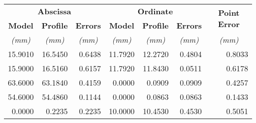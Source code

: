 \begin{table}[h!]
\centering
\begin{tabular}{|r|r|r|r|r|r|r|}
\hline
\multicolumn{3}{|c|}{\textbf{Abscissa}}                                                                             & \multicolumn{3}{c|}{\textbf{Ordinate}}                                                                             & \multicolumn{1}{c|}{\multirow{2}{*}{\textbf{Point Error}}} \\ \cline{1-6}
\multicolumn{1}{|c|}{\textbf{Model}} & \multicolumn{1}{c|}{\textbf{Profile}} & \multicolumn{1}{c|}{\textbf{Errors}} & \multicolumn{1}{c|}{\textbf{Model}} & \multicolumn{1}{c|}{\textbf{Profile}} & \multicolumn{1}{c|}{\textbf{Errors}} & \multicolumn{1}{c|}{}                                      \\ \hline
\multicolumn{1}{|c|}{\textit{(mm)}}           & \multicolumn{1}{c|}{\textit{(mm)}}      & \multicolumn{1}{c|}{\textit{(mm)}}      & \multicolumn{1}{c|}{\textit{(mm)}} & \multicolumn{1}{c|}{\textit{(mm)}}      & \multicolumn{1}{c|}{\textit{(mm)}}      & \multicolumn{1}{c|}{\textit{(mm)}}          \\ \hline
15.9010                              & 16.5450                               & 0.6438                               & 11.7920                             & 12.2720                               & 0.4804                               & 0.8033                                                     \\ \hline
15.9000                              & 16.5160                               & 0.6157                               & 11.7920                             & 11.8430                               & 0.0511                               & 0.6178                                                     \\ \hline
63.6000                              & 63.1840                               & 0.4159                               & 0.0000                              & 0.0909                                & 0.0909                               & 0.4257                                                     \\ \hline
54.6000                              & 54.4860                               & 0.1144                               & 0.0000                              & 0.0863                                & 0.0863                               & 0.1433                                                     \\ \hline
0.0000                               & 0.2235                                & 0.2235                               & 10.0000                             & 10.4530                               & 0.4530                               & 0.5051                                                     \\ \hline

\end{tabular}
\end{table}
